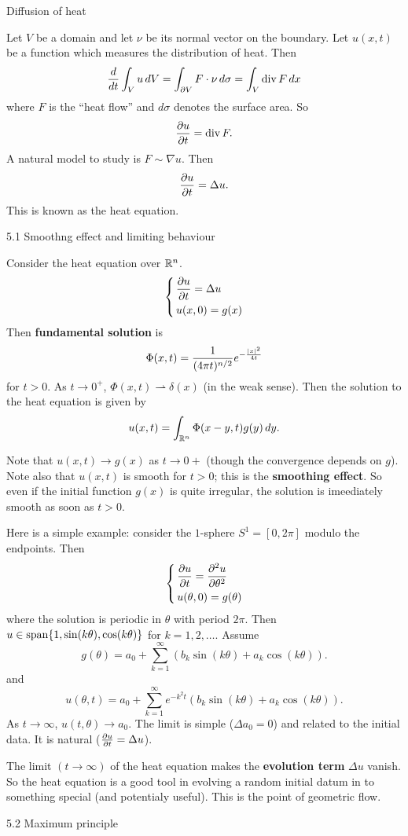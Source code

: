 Diffusion of heat

Let $V$ be a domain and let $\nu$ be its normal vector on the boundary.
Let $u(x,t)$ be a function which measures the distribution of heat.
Then
\[ \frac{d}{dt} \int_V u\,dV = \int_{\partial V} F\cdot\nu\,d\sigma = \int_V \operatorname{div} F\,dx \]
where $F$ is the ``heat flow'' and $d\sigma$ denotes the surface area.
So
\[ \frac{\partial u}{\partial t} = \operatorname{div} F. \]
A natural model to study is $F \sim \nabla u$.
Then
\[ \frac{\partial u}{\partial t} = \Delta u. \]
This is known as the heat equation.

5.1 Smoothng effect and limiting behaviour

Consider the heat equation over $\mathbb{R}^n$.
\begin{equation*}
  \left\{
    \begin{aligned}
      &\,\frac{\partial u}{\partial t}=\Delta u \\
      &\,u(x,0)=g(x)
    \end{aligned}
  \right.
\end{equation*}
Then \textbf{fundamental solution} is
\[ \Phi(x,t) = \frac{1}{(4\pi t)^{n/2}}e^{-\frac{\left\lvert x \right\rvert^2}{4t}} \]
for $t>0$.
As $t\to0^+$, $\Phi(x,t) \rightharpoonup \delta(x)$ (in the weak sense).
Then the solution to the heat equation is given by
\[ u(x,t) = \int_{\mathbb{R}^n} \Phi(x-y,t) g(y)\,dy. \]

Note that $u(x,t) \to g(x)$ as $t\to0+$ (though the convergence depends on $g$).
Note also that $u(x,t)$ is smooth for $t>0$; this is the \textbf{smoothing effect}.
So even if the initial function $g(x)$ is quite irregular, the solution is imeediately smooth as soon as $t>0$.

Here is a simple example: consider the $1$-sphere $S^1=[0,2\pi]$ modulo the endpoints.
Then
\begin{equation*}
  \left\{
    \begin{aligned}
      &\,\frac{\partial u}{\partial t}=\frac{\partial^2u}{\partial\theta^2} \\
      &\,u(\theta,0)=g(\theta)
    \end{aligned}
  \right.
\end{equation*}
where the solution is periodic in $\theta$ with period $2\pi$.
Then $u\in\operatorname{span}\{1,\sin(k\theta),\cos(k\theta)\}$ for $k=1,2,\ldots$.
Assume
\[ g(\theta) = a_0 + \sum_{k=1}^\infty \left( b_k\sin(k\theta)+a_k\cos(k\theta) \right). \]
and
\[ u(\theta,t) = a_0 + \sum_{k=1}^\infty e^{-k^2t} \left( b_k\sin(k\theta)+a_k\cos(k\theta) \right). \]
As $t\to\infty$, $u(t,\theta)\to a_0$.
The limit is simple ($\Delta a_0=0$) and related to the initial data.
It is natural ($\tfrac{\partial u}{\partial t}=\Delta u$).

The limit $(t\to\infty)$ of the heat equation makes the \textbf{evolution term} $\Delta u$ vanish.
So the heat equation is a good tool in evolving a random initial datum in to something special (and potentialy useful).
This is the point of geometric flow.

5.2 Maximum principle

